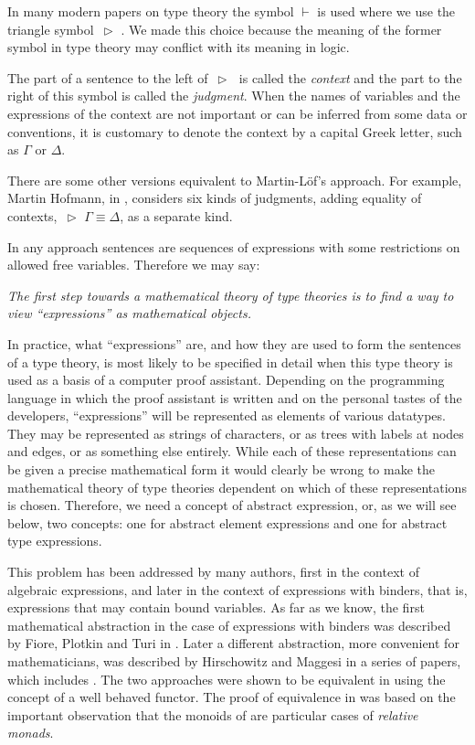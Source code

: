 \documentclass[12pt]{amsart}
\newcommand{\rh}{{\,\rhd\,\,}}
\begin{document}
In many modern papers on type theory the symbol $\vdash$ is used where we use
the triangle symbol $\rh$. We made this choice because the meaning of the
former symbol in type theory may conflict with its meaning in logic.

The part of a sentence to the left of $\rh$ is called the {\em context} and the part
to the right of this symbol is called the {\em judgment}. When the names of
variables and the expressions of the context are not important or can be
inferred from some data or conventions, it is customary to denote the context
by a capital Greek letter, such as $\Gamma$ or $\Delta$.

There are some other versions equivalent to Martin-L\"{o}f's approach. For
example, Martin Hofmann, in \cite{Hofmann}, considers six kinds of judgments,
adding equality of contexts, $\rh \Gamma\equiv\Delta$, as a separate kind.

In any approach sentences are sequences of expressions with some restrictions
on allowed free variables. Therefore we may say:

{\em The first step towards a mathematical theory of type theories is to find a
  way to view ``expressions'' as mathematical objects.}

In practice, what ``expressions'' are, and how they are used to form the sentences of a type theory,
is most likely to be specified in detail when this type theory is
used as a basis of a computer proof assistant. Depending on the programming
language in which the proof assistant is written and on the personal tastes of
the developers, ``expressions'' will be represented as elements of various
datatypes. They may be represented as strings of characters, or as trees
with labels at nodes and edges, or as something else entirely.  While
each of these representations can be given a precise mathematical form it would
clearly be wrong to make the mathematical theory of type theories dependent on
which of these representations is chosen.  Therefore, we need a concept of
abstract expression, or, as we will see below, two concepts: one for abstract
element expressions and one for abstract type expressions.

This problem has been addressed by many authors, first in the context of
algebraic expressions, and later in the context of expressions with binders,
that is, expressions that may contain bound variables. As far as we know, the
first mathematical abstraction in the case of expressions with binders was
described by Fiore, Plotkin and Turi in \cite{FPT}. Later a different abstraction,
more convenient for mathematicians, was described by Hirschowitz and
Maggesi in a series of papers, which includes \cite{HM2010}.  The two approaches were
shown to be equivalent in \cite{ACU,ACU2} using the concept of a well
behaved functor.
The proof of equivalence in \cite{ACU,ACU2} was based on the important
observation that the monoids of \cite{FPT} are particular cases of {\em
  relative monads}.
\end{document}
